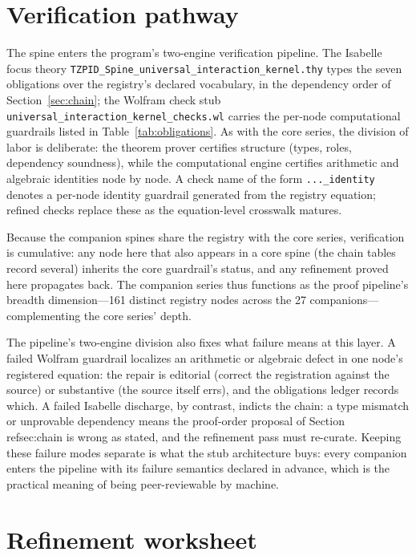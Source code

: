 \documentclass[11pt]{article}
\theoremstyle{remark}
\begin{document}
\section{Verification pathway}
\label{sec:verify}

The spine enters the program's two-engine verification pipeline. The Isabelle focus theory \texttt{TZPID\_Spine\_universal\_interaction\_kernel.thy} types the seven obligations over the registry's declared vocabulary, in the dependency order of Section~\ref{sec:chain}; the Wolfram check stub \texttt{universal\_interaction\_kernel\_checks.wl} carries the per-node computational guardrails listed in Table~\ref{tab:obligations}. As with the core series, the division of labor is deliberate: the theorem prover certifies structure (types, roles, dependency soundness), while the computational engine certifies arithmetic and algebraic identities node by node. A check name of the form \texttt{...\_identity} denotes a per-node identity guardrail generated from the registry equation; refined checks replace these as the equation-level crosswalk matures.

Because the companion spines share the registry with the core series, verification is cumulative: any node here that also appears in a core spine (the chain tables record several) inherits the core guardrail's status, and any refinement proved here propagates back. The companion series thus functions as the proof pipeline's breadth dimension---161 distinct registry nodes across the 27 companions---complementing the core series' depth.

The pipeline's two-engine division also fixes what failure means at this layer. A failed Wolfram guardrail localizes an arithmetic or algebraic defect in one node's registered equation: the repair is editorial (correct the registration against the source) or substantive (the source itself errs), and the obligations ledger records which. A failed Isabelle discharge, by contrast, indicts the chain: a type mismatch or unprovable dependency means the proof-order proposal of Section~\\ref{sec:chain} is wrong as stated, and the refinement pass must re-curate. Keeping these failure modes separate is what the stub architecture buys: every companion enters the pipeline with its failure semantics declared in advance, which is the practical meaning of being peer-reviewable by machine.

\section{Refinement worksheet}
\label{sec:worksheet}
\end{document}
